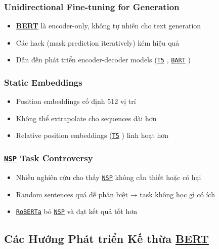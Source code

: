     \subsubsection{Unidirectional Fine-tuning for Generation}
    \begin{itemize}
        \item \hyperref[acro:bert]{\textbf{BERT}} là encoder-only, không tự nhiên cho text generation
        \item Các hack (mask prediction iteratively) kém hiệu quả
        \item Dẫn đến phát triển encoder-decoder models (\hyperref[acro:t5]{\texttt{T5}} \cite{raffel2020exploring}, \hyperref[acro:bart]{\texttt{BART}} \cite{lewis2019bart})
    \end{itemize}
    
    \subsubsection{Static Embeddings}
    \begin{itemize}
        \item Position embeddings cố định 512 vị trí
        \item Không thể extrapolate cho sequences dài hơn
        \item Relative position embeddings (\hyperref[acro:t5]{\texttt{T5}} \cite{raffel2020exploring}) linh hoạt hơn
    \end{itemize}
    
    \subsubsection{\hyperref[acro:nsp]{\texttt{NSP}} Task Controversy}
    \begin{itemize}
        \item Nhiều nghiên cứu cho thấy \hyperref[acro:nsp]{\texttt{NSP}} không cần thiết hoặc có hại \cite{liu2019roberta}
        \item Random sentences quá dễ phân biệt → task không học gì có ích
        \item \hyperref[acro:roberta]{\texttt{RoBERTa}} \cite{liu2019roberta} bỏ \hyperref[acro:nsp]{\texttt{NSP}} và đạt kết quả tốt hơn
    \end{itemize}
    
    \subsection{Các Hướng Phát triển Kế thừa \hyperref[acro:bert]{\textbf{BERT}}}
    \label{ssec:huong_phat_trien_ke_thua}
    
